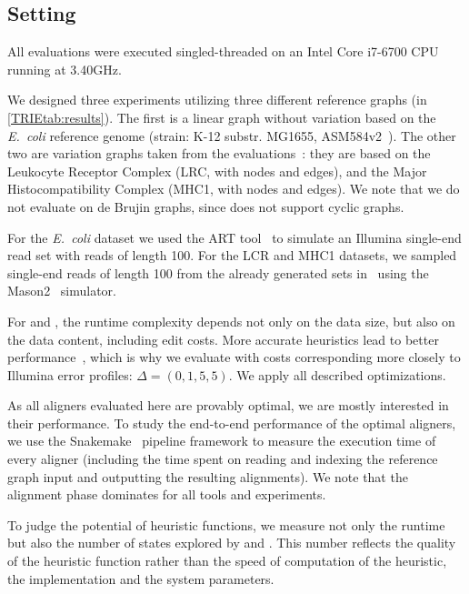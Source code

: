 \subsection{Setting}
All evaluations were executed singled-threaded on an Intel Core i7-6700 CPU running
at 3.40GHz.

We designed three experiments utilizing three different reference graphs (in
\cref{TRIEtab:results}). The first is a linear graph without variation based on the
\textit{E.~coli} reference genome (strain: K-12 substr. MG1655,
ASM584v2~\cite{howe2019ensembl}). The other two are variation graphs taken from
the \pasgal evaluations~\cite{jain_accelerating_2019}: they are based on the
Leukocyte Receptor Complex (LRC, with  nodes and
 edges), and the Major Histocompatibility Complex (MHC1, with
 nodes and  edges).
%
We note that we do not evaluate on de Brujin graphs, since \pasgal does not
support cyclic graphs.

For the \textit{E.~coli} dataset we used the ART tool~\cite{huang_art_2012} to simulate an
Illumina single-end read set with  reads of length 100. For the LCR and
MHC1 datasets, we sampled  single-end reads of length 100 from the already
generated sets in~\cite{jain_accelerating_2019} using the
Mason2~\cite{holtgrewe_mason_2010} simulator.

For \dijkstra and \astarix, the runtime complexity depends not only on the data
size, but also on the data content, including edit costs. More accurate
heuristics lead to better \A performance~\cite{pearl_discovery_1983}, which is
why we evaluate \astarix with costs corresponding more closely to Illumina error
profiles: $\Delta=(0,1,5,5)$. We apply all described optimizations.

As all aligners evaluated here are provably optimal, we are mostly interested in
their performance.
%
To study the end-to-end performance of the optimal aligners, we use the
Snakemake~\cite{koster_snakemakescalable_2012} pipeline framework to measure the
execution time of every aligner (including the time spent on reading and
indexing the reference graph input and outputting the resulting alignments). We
note that the alignment phase dominates for all tools and experiments.

To judge the potential of heuristic functions, we measure not only the runtime
but also the number of states explored by \astarix and \dijkstra. This number
reflects the quality of the heuristic function rather than the speed of
computation of the heuristic, the implementation and the system parameters.

